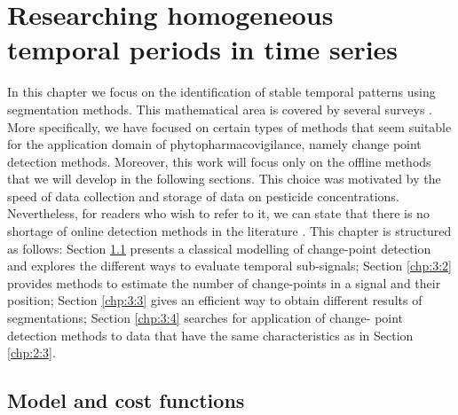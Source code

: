 \chapter{Researching homogeneous temporal periods in time series}\label{chp:3}

\minitoc

\clearpage


In this chapter we focus on the identification of stable temporal patterns using segmentation methods. This mathematical area is covered by several surveys \citep{truong2020,basseville1993detection,bardet2020}. More specifically, we have focused on certain types of methods that seem suitable for the application domain of phytopharmacovigilance, namely change point detection methods. Moreover, this work will focus only on the offline methods that we will develop in the following sections. This choice was motivated by the speed of data collection and storage of data on pesticide concentrations. Nevertheless, for readers who wish to refer to it, we can state that there is no shortage of online detection methods in the literature \citep{liu2017change,Li2021,hohle2010online,ranganathan2010pliss,li2015m}.
This chapter is structured as follows: Section \ref{chp:3:1} presents a classical modelling of change-point detection and explores the different ways to evaluate temporal sub-signals; Section \ref{chp:3:2} provides methods to estimate the number of change-points in a signal and their position; Section \ref{chp:3:3} gives an efficient way to obtain different results of segmentations; Section \ref{chp:3:4} searches for application of change- point detection methods to data that have the same characteristics as in Section \ref{chp:2:3}.

\section{Model and cost functions}\label{chp:3:1}

